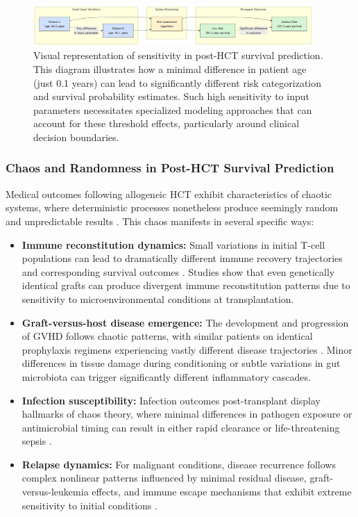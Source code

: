 \begin{figure}[H]
    \centering
    \includegraphics[width=0.95\textwidth]{figures/SensitivityDiagram.png}
    \caption{Visual representation of sensitivity in post-HCT survival prediction. This diagram illustrates how a minimal difference in patient age (just 0.1 years) can lead to significantly different risk categorization and survival probability estimates. Such high sensitivity to input parameters necessitates specialized modeling approaches that can account for these threshold effects, particularly around clinical decision boundaries.}
    \label{fig:sensitivity_diagram}
\end{figure}

\subsubsection{Chaos and Randomness in Post-HCT Survival Prediction}

Medical outcomes following allogeneic HCT exhibit characteristics of chaotic systems, where deterministic processes nonetheless produce seemingly random and unpredictable results \cite{frontiers_ai_hct}. This chaos manifests in several specific ways:

\begin{itemize}
    \item \textbf{Immune reconstitution dynamics:} Small variations in initial T-cell populations can lead to dramatically different immune recovery trajectories and corresponding survival outcomes \cite{stmcls_clonality}. Studies show that even genetically identical grafts can produce divergent immune reconstitution patterns due to sensitivity to microenvironmental conditions at transplantation.
    
    \item \textbf{Graft-versus-host disease emergence:} The development and progression of GVHD follows chaotic patterns, with similar patients on identical prophylaxis regimens experiencing vastly different disease trajectories \cite{ash_chronic_gvhd}. Minor differences in tissue damage during conditioning or subtle variations in gut microbiota can trigger significantly different inflammatory cascades.
    
    \item \textbf{Infection susceptibility:} Infection outcomes post-transplant display hallmarks of chaos theory, where minimal differences in pathogen exposure or antimicrobial timing can result in either rapid clearance or life-threatening sepsis \cite{uptodate_hct}.
    
    \item \textbf{Relapse dynamics:} For malignant conditions, disease recurrence follows complex nonlinear patterns influenced by minimal residual disease, graft-versus-leukemia effects, and immune escape mechanisms that exhibit extreme sensitivity to initial conditions \cite{mdpi_cancers}.
\end{itemize}

